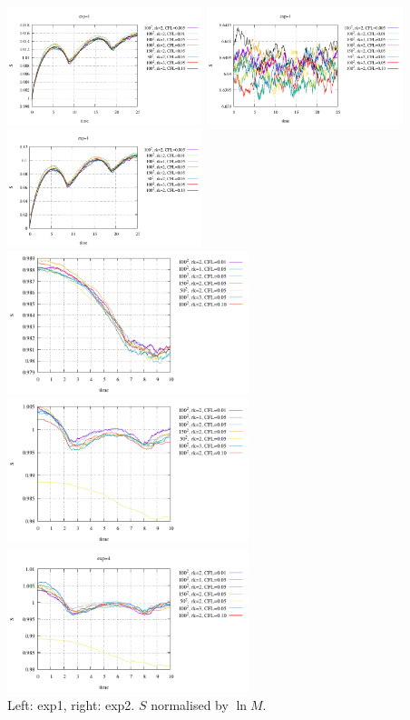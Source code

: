\begin{center}
\includegraphics[width=5.7cm]{python_codes/fieldstone_137/exp1/S.pdf}
\includegraphics[width=5.7cm]{python_codes/fieldstone_137/exp1/S2.pdf}
\includegraphics[width=5.7cm]{python_codes/fieldstone_137/exp1/S3.pdf}\\
\includegraphics[width=7cm]{python_codes/fieldstone_137/exp2/S.pdf}\\
\includegraphics[width=7cm]{python_codes/fieldstone_137/exp3/S.pdf}
\includegraphics[width=7cm]{python_codes/fieldstone_137/exp4/S.pdf}\\
{\captionfont Left: exp1, right: exp2. $S$ normalised by $\ln{M}$.}
\end{center}

